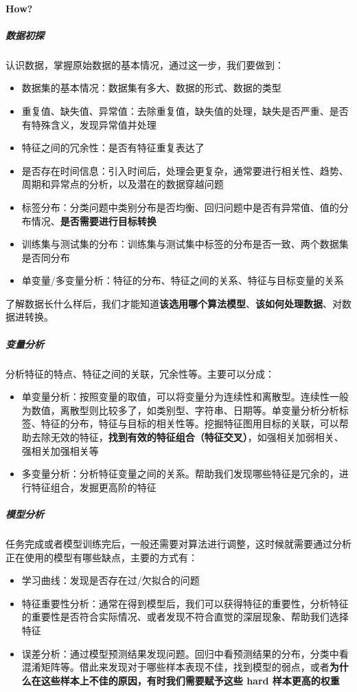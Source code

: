 \paragraph{How?}
\subparagraph{数据初探}认识数据，掌握原始数据的基本情况，通过这一步，我们要做到：
\begin{itemize}
	\item 数据集的基本情况：数据集有多大、数据的形式、数据的类型
	\item 重复值、缺失值、异常值：去除重复值，缺失值的处理，缺失是否严重、是否有特殊含义，发现异常值并处理
	\item 特征之间的冗余性：是否有特征重复表达了
	\item 是否存在时间信息：引入时间后，处理会更复杂，通常要进行相关性、趋势、周期和异常点的分析，以及潜在的数据穿越问题
	\item 标签分布：分类问题中类别分布是否均衡、回归问题中是否有异常值、值的分布情况、\textbf{是否需要进行目标转换}
	\item 训练集与测试集的分布：训练集与测试集中标签的分布是否一致、两个数据集是否同分布
	\item 单变量/多变量分析：特征的分布、特征之间的关系、特征与目标变量的关系
\end{itemize}
了解数据长什么样后，我们才能知道\textbf{该选用哪个算法模型}、\textbf{该如何处理数据}、对数据进转换。

\subparagraph{变量分析}分析特征的特点、特征之间的关联，冗余性等。主要可以分成：
\begin{itemize}
	\item 单变量分析：按照变量的取值，可以将变量分为连续性和离散型。连续性一般为数值，离散型则比较多了，如类别型、字符串、日期等。单变量分析分析标签、特征的分布，特征与目标的相关性等。挖掘特征图用目标的关联，可以帮助去除无效的特征，\textbf{找到有效的特征组合（特征交叉）}，如强相关加弱相关、强相关加强相关等
	\item 多变量分析：分析特征变量之间的关系。帮助我们发现哪些特征是冗余的，进行特征组合，发掘更高阶的特征
\end{itemize}

\subparagraph{模型分析}任务完成或者模型训练完后，一般还需要对算法进行调整，这时候就需要通过分析正在使用的模型有哪些缺点，主要的方式有：
\begin{itemize}
	\item 学习曲线：发现是否存在过/欠拟合的问题
	\item 特征重要性分析：通常在得到模型后，我们可以获得特征的重要性，分析特征的重要性是否符合实际情况、或者发现不符合直觉的深层现象、帮助我们选择特征
	\item 误差分析：通过模型预测结果发现问题。回归中看预测结果的分布，分类中看混淆矩阵等。借此来发现对于哪些样本表现不佳，找到模型的弱点，或者\textbf{为什么在这些样本上不佳的原因，有时我们需要赋予这些 hard 样本更高的权重}
\end{itemize}





